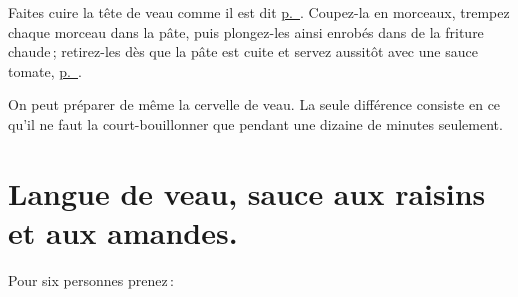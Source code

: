 Faites cuire la tête de veau comme il est dit
\hyperlink{p0425}{p. \pageref{pg0425}}. Coupez-la en morceaux, trempez chaque
morceau dans la pâte, puis plongez-les ainsi enrobés dans de la friture
chaude ; retirez-les dès que la pâte est cuite et servez aussitôt avec une
sauce tomate, \hyperlink{p0401}{p. \pageref{pg0401}}.

\sk
{}
On peut préparer de même la cervelle de veau. La seule différence consiste en
ce qu'il ne faut la court-bouillonner que pendant une dizaine de minutes
seulement.

\section*{\centering Langue de veau, sauce aux raisins et aux amandes.}

Pour six personnes prenez :

\medskip

